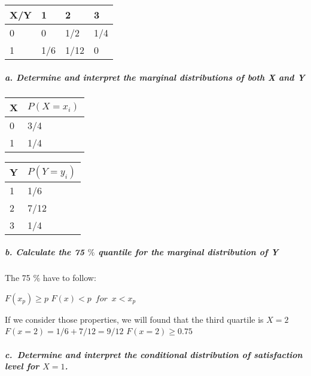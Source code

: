 \documentclass[
]{article}
\begin{document}
\begin{longtable}[]{@{}llll@{}}
\toprule
X/Y & 1 & 2 & 3 \\
\midrule
\endhead
0 & 0 & 1/2 & 1/4 \\
1 & 1/6 & 1/12 & 0 \\
\bottomrule
\end{longtable}

\hypertarget{a.-determine-and-interpret-the-marginal-distributions-of-both-x-and-y}{%
\subparagraph{a. Determine and interpret the marginal distributions of
both X and
Y}\label{a.-determine-and-interpret-the-marginal-distributions-of-both-x-and-y}}

\begin{longtable}[]{@{}ll@{}}
\toprule
X & \(P(X = x_i)\) \\
\midrule
\endhead
0 & 3/4 \\
1 & 1/4 \\
\bottomrule
\end{longtable}

\begin{longtable}[]{@{}ll@{}}
\toprule
Y & \(P(Y = y_i)\) \\
\midrule
\endhead
1 & 1/6 \\
2 & 7/12 \\
3 & 1/4 \\
\bottomrule
\end{longtable}

\hypertarget{b.-calculate-the-75-quantile-for-the-marginal-distribution-of-y}{%
\subparagraph{\texorpdfstring{b. Calculate the 75 \(\%\) quantile for
the marginal distribution of
Y}{b. Calculate the 75 \textbackslash\% quantile for the marginal distribution of Y}}\label{b.-calculate-the-75-quantile-for-the-marginal-distribution-of-y}}

The 75 \(\%\) have to follow:

\(F(x_p)\geq p\) \(F(x) < p \enspace for \enspace x < x_p\)

If we consider those properties, we will found that the third quartile
is \(X=2\) \(F(x = 2) = 1/6 + 7/12 = 9/12\) \(F(x=2) \geq 0.75\)

\hypertarget{c.-determine-and-interpret-the-conditional-distribution-of-satisfaction-level-for-x-1.}{%
\subparagraph{\texorpdfstring{c.~Determine and interpret the conditional
distribution of satisfaction level for
\(X = 1\).}{c.~Determine and interpret the conditional distribution of satisfaction level for X = 1.}}\label{c.-determine-and-interpret-the-conditional-distribution-of-satisfaction-level-for-x-1.}}
\end{document}
